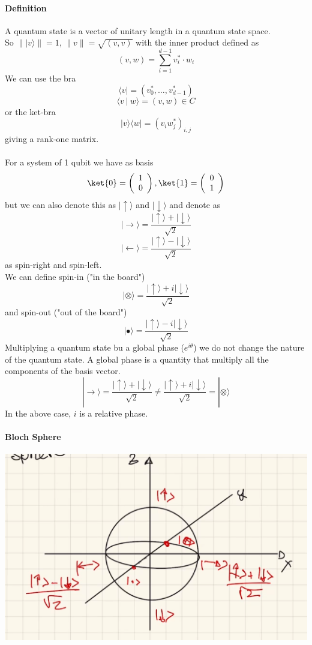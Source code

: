 \documentclass[10pt]{report}
\begin{document}
\paragraph{Definition} A quantum state is a vector of unitary length in a quantum state space.\\
So $\| |v\rangle\| = 1$, $\|v\|=\sqrt{(v,v)}$ with the inner product defined as
$$(v,w)=\sum_{i=1}^{d-1}v_i^*\cdot w_i$$
We can use the bra $$\langle v| = (v_0^*,\ldots,v_{d-1}^*)$$
$$\langle v\:|\:w\rangle = (v,w)\in C$$
or the ket-bra $$|v\rangle\langle w| = (v_iw_j^*)_{i,j}$$ giving a rank-one matrix.
\paragraph{} For a system of 1 qubit we have as basis $$\ket{0} = \left(\begin{array}{c}
1\\0
\end{array}\right), \ket{1}=\left(\begin{array}{c}
0\\1
\end{array}\right)$$ but we can also denote this as $|\uparrow\rangle$ and $|\downarrow\rangle$ and denote as $$|\rightarrow\rangle = \frac{|\uparrow\rangle + |\downarrow\rangle}{\sqrt{2}}$$
$$|\leftarrow\rangle = \frac{|\uparrow\rangle - |\downarrow\rangle}{\sqrt{2}}$$
as spin-right and spin-left.\\
We can define spin-in ("in the board")
$$|\otimes\rangle = \frac{|\uparrow\rangle + i|\downarrow\rangle}{\sqrt{2}}$$
and spin-out ("out of the board")
$$|\bullet\rangle = \frac{|\uparrow\rangle - i|\downarrow\rangle}{\sqrt{2}}$$
Multiplying a quantum state bu a global phase ($e^{i\theta}$) we do not change the nature of the quantum state. A global phase is a quantity that multiply all the components of the basis vector.
$$|\rightarrow\rangle = \frac{|\uparrow\rangle + |\downarrow\rangle}{\sqrt{2}} \neq \frac{|\uparrow\rangle + i|\downarrow\rangle}{\sqrt{2}} = |
\otimes\rangle$$
In the above case, $i$ is a relative phase.
\paragraph{Bloch Sphere} %
\begin{center}
	\includegraphics[scale=0.5]{11.png}
\end{center}
\end{document}
